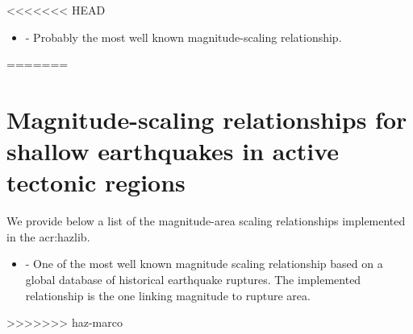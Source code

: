 <<<<<<< HEAD
\begin{itemize} 
    \item \cite{wells1994} - Probably the most well known magnitude-scaling 
    relationship.
\end{itemize}
=======
\label{sec:msr_list}

\section{Magnitude-scaling relationships for shallow earthquakes 
    in active tectonic regions}
We provide below a list of the magnitude-area scaling relationships 
implemented in the \gls{acr:hazlib}. 
\begin{itemize} 
    \item \cite{wells1994} - One of the most well known magnitude scaling
        relationship based on a global database of historical earthquake 
        ruptures. The implemented relationship is the one linking magnitude 
        to rupture area.
\end{itemize}
%
%
>>>>>>> haz-marco
